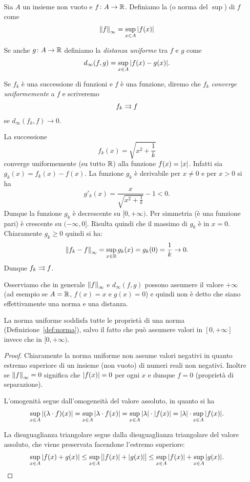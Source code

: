 \begin{definition}
\mymark{***}
Sia $A$ un insieme non vuoto e
$f\colon A \to \mathbb R$.
Definiamo la  (o norma del $\sup$)
di $f$ come
\[
  {\left\Vert f\right\Vert}_\infty = \sup_{x\in A} {\left|f(x)\right|}
\]

Se anche $g\colon A \to \mathbb R$
definiamo la \emph{distanza uniforme}
tra $f$ e $g$ come
\[
  d_\infty(f,g) = \sup_{x\in A} {\left|f(x)-g(x)\right|}.
\]

Se $f_k$ è una successione di funzioni e $f$ è una funzione, diremo che $f_k$
\emph{converge uniformemente}
a $f$
e scriveremo
\[
f_k \rightrightarrows f
\] se
$d_\infty(f_k,f)\to 0$.
\end{definition}


\begin{example}
\label{ex:466533}
La successione
\[
f_k(x) = \sqrt{x^2 + \frac{1}{k}}
\]
converge uniformemente (su tutto $\mathbb R$) alla funzione $f(x) = {\left|x\right|}$. Infatti sia $g_k(x) = f_k(x) - f(x)$. La funzione $g_k$ è derivabile per $x\neq 0$ e per $x>0$ si ha
\[
  g'_k(x) = \frac{x}{\sqrt{x^2+\frac 1 k}} - 1 < 0.
\]
Dunque la funzione $g_k$ è decrescente su $[0,+\infty)$. Per simmetria (è una funzione pari) è crescente su $(-\infty, 0]$. Risulta quindi che il massimo di $g_k$ è in $x=0$. Chiaramente $g_k \ge 0$ quindi si ha:
\[
  {\left\Vert f_k - f\right\Vert}_\infty = \sup_{x\in \mathbb R} g_k(x) = g_k(0) = \frac{1}{k} \to 0.
\]
Dunque $f_k \rightrightarrows f$.
\end{example}

Osserviamo che in generale ${\left\Vert f\right\Vert}_\infty$ e $d_\infty(f,g)$ possono assumere il valore $+\infty$ (ad esempio se $A=\mathbb R$, $f(x)=x$ e $g(x)=0$)
e quindi non è detto che siano effettivamente
una norma e una distanza.

\begin{theorem}
La norma uniforme soddisfa tutte le proprietà di una norma
(Definizione~\ref{def:norma}), salvo il fatto che può assumere valori in $[0,+\infty]$ invece che in $[0,+\infty)$.
\end{theorem}
%
\begin{proof}
Chiaramente la norma uniforme non assume valori negativi in quanto estremo superiore di un insieme (non vuoto) di numeri reali non negativi. Inoltre se ${\left\Vert f\right\Vert}_\infty=0$ significa che ${\left|f(x)\right|}=0$ per ogni $x$ e dunque $f=0$ (proprietà di separazione).

L'omogenità segue dall'omogeneità del valore assoluto, in quanto si ha
\[
  \sup_{x\in A} {\left|(\lambda \cdot f)(x)\right|}
  = \sup_{x\in A}{\left|\lambda \cdot f(x)\right|}
  = \sup_{x\in A}{\left|\lambda\right|}\cdot {\left|f(x)\right|}
  = {\left|\lambda\right|} \cdot \sup_{x\in A}{\left|f(x)\right|}.
\]

La disuguaglianza triangolare segue dalla disuguaglianza triangolare del valore assoluto, che viene preservata facendone l'estremo superiore:
\[
  \sup_{x\in A} {\left|f(x)+g(x)\right|}
  \le \sup_{x\in A} {\left[ {\left|f(x)\right|} + {\left|g(x)\right|} \right]}
  \le \sup_{x\in A} {\left|f(x)\right|} + \sup_{x\in A} {\left|g(x)\right|}.
\]
\end{proof}

